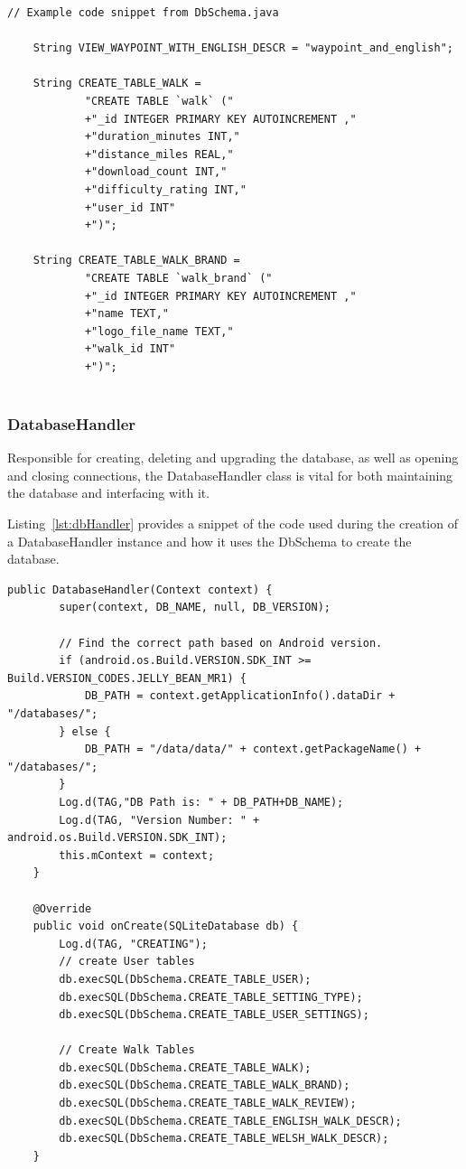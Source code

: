 \documentclass[11pt,a4paper]{article}
\begin{document}
\begin{lstlisting}[captionpos=b, caption=DbSchema Snippet, label=lst:dbSchema, frame=single]
	// Example code snippet from DbSchema.java
	
	String VIEW_WAYPOINT_WITH_ENGLISH_DESCR = "waypoint_and_english";
	
	String CREATE_TABLE_WALK = 
			"CREATE TABLE `walk` (" 
			+"_id INTEGER PRIMARY KEY AUTOINCREMENT ,"
			+"duration_minutes INT,"
			+"distance_miles REAL,"
			+"download_count INT,"
			+"difficulty_rating INT,"
			+"user_id INT"
			+")";
	
	String CREATE_TABLE_WALK_BRAND = 
			"CREATE TABLE `walk_brand` ("
			+"_id INTEGER PRIMARY KEY AUTOINCREMENT ,"
			+"name TEXT,"
			+"logo_file_name TEXT,"
			+"walk_id INT"
			+")";
			
\end{lstlisting}

\subsubsection{DatabaseHandler}
Responsible for creating, deleting and upgrading the database, as well as opening and closing connections, the DatabaseHandler class is vital for both maintaining the database and interfacing with it.

Listing~\ref{lst:dbHandler} provides a snippet of the code used during the creation of a DatabaseHandler instance and how it uses the DbSchema to create the database.

\begin{lstlisting}[captionpos=b, caption=DatabaseHandler Snippet, label=lst:dbHandler, frame=single]
	public DatabaseHandler(Context context) {
		super(context, DB_NAME, null, DB_VERSION);
		
		// Find the correct path based on Android version.
		if (android.os.Build.VERSION.SDK_INT >= Build.VERSION_CODES.JELLY_BEAN_MR1) {
			DB_PATH = context.getApplicationInfo().dataDir + "/databases/";
		} else {
			DB_PATH = "/data/data/" + context.getPackageName() + "/databases/";
		}
		Log.d(TAG,"DB Path is: " + DB_PATH+DB_NAME);
		Log.d(TAG, "Version Number: " + android.os.Build.VERSION.SDK_INT);
		this.mContext = context;
	}

	@Override
	public void onCreate(SQLiteDatabase db) {
		Log.d(TAG, "CREATING");
		// create User tables
		db.execSQL(DbSchema.CREATE_TABLE_USER);
		db.execSQL(DbSchema.CREATE_TABLE_SETTING_TYPE);
		db.execSQL(DbSchema.CREATE_TABLE_USER_SETTINGS);
		
		// Create Walk Tables
		db.execSQL(DbSchema.CREATE_TABLE_WALK);
		db.execSQL(DbSchema.CREATE_TABLE_WALK_BRAND);
		db.execSQL(DbSchema.CREATE_TABLE_WALK_REVIEW);
		db.execSQL(DbSchema.CREATE_TABLE_ENGLISH_WALK_DESCR);
		db.execSQL(DbSchema.CREATE_TABLE_WELSH_WALK_DESCR);
	}
\end{lstlisting}
\end{document}
